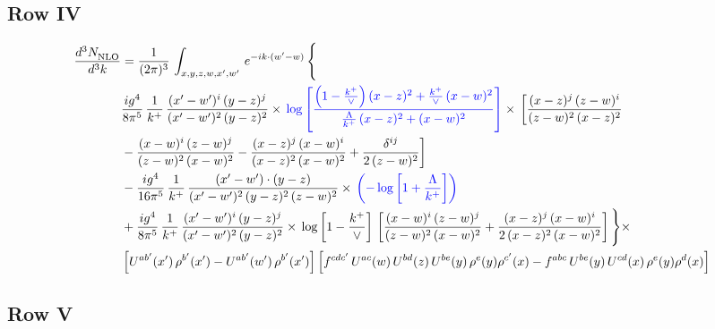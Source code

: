\documentclass[9pt]{article}
\newcommand{\new}[1]{{\color{blue}#1}}
\numberwithin{equation}{section}
\begin{document}
\subsection{Row IV}
\begin{align}
    \frac{d^{3}N_{\rm NLO}^{\rm}}{d^{3}k}  & =  \frac{1}{(2\pi)^{3}}\,
    \int_{x,y,z,w,x',w'}\,e^{-ik\cdot (w^\prime-w)}\,\Bigg\{\notag \\ & \frac{ig^{4}}{8\pi^{5}}\,\frac{1}{k^{+}}\,\frac{(x'-w')^{i}\,(y-z)^{j}}{(x'-w')^{2}\,(y-z)^{2}}\times\,\new{\log{\left[\frac{\left(1-\frac{k^{+}}{\vee}\right)(x-z)^{2}+\frac{k^{+}}{\vee}\,(x-w)^{2}}{\frac{\Lambda}{k^{+}}\,(x-z)^{2}+(x-w)^{2}}\right]}}\times\, \bigg[\frac{(x-z)^{j}\,(z-w)^{i}}{(z-w)^{2}\,(x-z)^{2}}\notag \\ & -\frac{(x-w)^{i}\,(z-w)^{j}}{(z-w)^{2}\,(x-w)^{2}}-\frac{(x-z)^{j}\,(x-w)^{i}}{(x-z)^{2}\,(x-w)^{2}}+\frac{\delta^{ij}}{2\,(z-w)^{2}}\bigg]\notag \\ & -\frac{ig^{4}}{16\pi^{5}}\,\frac{1}{k^{+}}\,\frac{(x'-w')\cdot (y-z)}{(x'-w')^{2}\,(y-z)^{2}\,(z-w)^{2}}\times\,\new{\left(-\log{\left[1+\frac{\Lambda}{k^{+}}\right]}\right)}\notag \\ & + \frac{ig^{4}}{8\pi^{5}}\,\frac{1}{k^{+}}\,\frac{(x'-w')^{i}\,(y-z)^{j}}{(x'-w')^{2}\,(y-z)^{2}}\times\, \log{\left[1-\frac{k^{+}}{\vee}\right]}\,\left[\frac{(x-w)^{i}\,(z-w)^{j}}{(z-w)^{2}\,(x-w)^{2}}+\frac{(x-z)^{j}\,(x-w)^{i}}{2\, (x-z)^{2}\,(x-w)^{2}}\right] \Bigg\}\times\notag \\ &  \left[U^{ab'}(x')\,\rho^{b'}(x')-U^{ab'}(w')\,\rho^{b'}(x')\right] \left[f^{cdc'}\,U^{ac}(w)\,U^{bd}(z)\,U^{be}(y)\,\rho^{e}(y)\rho^{c'}(x)-f^{abc}\,U^{be}(y)\,U^{cd}(x)\,\rho^{e}(y)\rho^{d}(x)\right]
\end{align}
\subsection{Row V}
\end{document}
